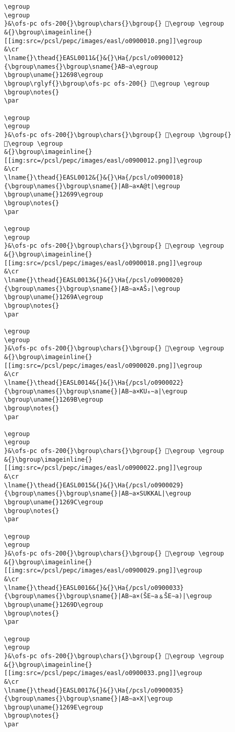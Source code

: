 \begin{verbatim}
\egroup
\egroup
}&\ofs-pc ofs-200{}\bgroup\chars{}\bgroup{} 𒚗\egroup \egroup
&{}\bgroup\imageinline{}[[img:src=/pcsl/pepc/images/easl/o0900010.png]]\egroup
&\cr
\lname{}\thead{}EASL0011&{}&{}\Ha{/pcsl/o0900012}{\bgroup\names{}\bgroup\sname{}AB∼a\egroup
\bgroup\uname{}12698\egroup
\bgroup\rglyf{}\bgroup\ofs-pc ofs-200{} 𒚘\egroup \egroup
\bgroup\notes{}
\par 

\egroup
\egroup
}&\ofs-pc ofs-200{}\bgroup\chars{}\bgroup{} 𒚢\egroup \bgroup{} 𒚘\egroup \egroup
&{}\bgroup\imageinline{}[[img:src=/pcsl/pepc/images/easl/o0900012.png]]\egroup
&\cr
\lname{}\thead{}EASL0012&{}&{}\Ha{/pcsl/o0900018}{\bgroup\names{}\bgroup\sname{}|AB∼a×A@t|\egroup
\bgroup\uname{}12699\egroup
\bgroup\notes{}
\par 

\egroup
\egroup
}&\ofs-pc ofs-200{}\bgroup\chars{}\bgroup{} 𒚙\egroup \egroup
&{}\bgroup\imageinline{}[[img:src=/pcsl/pepc/images/easl/o0900018.png]]\egroup
&\cr
\lname{}\thead{}EASL0013&{}&{}\Ha{/pcsl/o0900020}{\bgroup\names{}\bgroup\sname{}|AB∼a×AŠ₂|\egroup
\bgroup\uname{}1269A\egroup
\bgroup\notes{}
\par 

\egroup
\egroup
}&\ofs-pc ofs-200{}\bgroup\chars{}\bgroup{} 𒚚\egroup \egroup
&{}\bgroup\imageinline{}[[img:src=/pcsl/pepc/images/easl/o0900020.png]]\egroup
&\cr
\lname{}\thead{}EASL0014&{}&{}\Ha{/pcsl/o0900022}{\bgroup\names{}\bgroup\sname{}|AB∼a×KU₆∼a|\egroup
\bgroup\uname{}1269B\egroup
\bgroup\notes{}
\par 

\egroup
\egroup
}&\ofs-pc ofs-200{}\bgroup\chars{}\bgroup{} 𒚛\egroup \egroup
&{}\bgroup\imageinline{}[[img:src=/pcsl/pepc/images/easl/o0900022.png]]\egroup
&\cr
\lname{}\thead{}EASL0015&{}&{}\Ha{/pcsl/o0900029}{\bgroup\names{}\bgroup\sname{}|AB∼a×SUKKAL|\egroup
\bgroup\uname{}1269C\egroup
\bgroup\notes{}
\par 

\egroup
\egroup
}&\ofs-pc ofs-200{}\bgroup\chars{}\bgroup{} 𒚜\egroup \egroup
&{}\bgroup\imageinline{}[[img:src=/pcsl/pepc/images/easl/o0900029.png]]\egroup
&\cr
\lname{}\thead{}EASL0016&{}&{}\Ha{/pcsl/o0900033}{\bgroup\names{}\bgroup\sname{}|AB∼a×(ŠE∼a﹠ŠE∼a)|\egroup
\bgroup\uname{}1269D\egroup
\bgroup\notes{}
\par 

\egroup
\egroup
}&\ofs-pc ofs-200{}\bgroup\chars{}\bgroup{} 𒚝\egroup \egroup
&{}\bgroup\imageinline{}[[img:src=/pcsl/pepc/images/easl/o0900033.png]]\egroup
&\cr
\lname{}\thead{}EASL0017&{}&{}\Ha{/pcsl/o0900035}{\bgroup\names{}\bgroup\sname{}|AB∼a×X|\egroup
\bgroup\uname{}1269E\egroup
\bgroup\notes{}
\par 


\end{verbatim}
